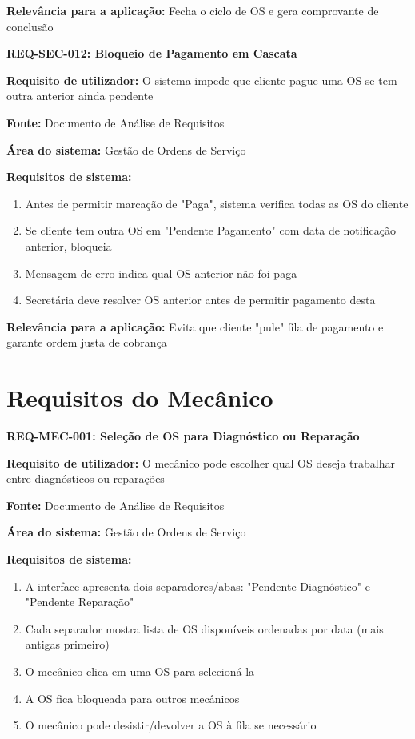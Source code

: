 \documentclass[11pt,a4paper]{article}
\newcommand{\reqheader}[1]{{\noindent\large\bfseries\color{sectionblue}#1}\par\vspace{0.3cm}}
\newcommand{\reqfield}[2]{{\noindent\textbf{#1:} #2}\par\vspace{0.2cm}}
\begin{document}
\reqfield{Relevância para a aplicação}{Fecha o ciclo de OS e gera comprovante de conclusão}

\vspace{0.8cm}

\reqheader{REQ-SEC-012: Bloqueio de Pagamento em Cascata}

\reqfield{Requisito de utilizador}{O sistema impede que cliente pague uma OS se tem outra anterior ainda pendente}

\reqfield{Fonte}{Documento de Análise de Requisitos}

\reqfield{Área do sistema}{Gestão de Ordens de Serviço}

\reqfield{Requisitos de sistema}{
	\begin{enumerate}
		\item Antes de permitir marcação de "Paga", sistema verifica todas as OS do cliente
		\item Se cliente tem outra OS em "Pendente Pagamento" com data de notificação anterior, bloqueia
		\item Mensagem de erro indica qual OS anterior não foi paga
		\item Secretária deve resolver OS anterior antes de permitir pagamento desta
	\end{enumerate}
}

\reqfield{Relevância para a aplicação}{Evita que cliente "pule" fila de pagamento e garante ordem justa de cobrança}

\vspace{1.5cm}


\section*{Requisitos do Mecânico}

\reqheader{REQ-MEC-001: Seleção de OS para Diagnóstico ou Reparação}

\reqfield{Requisito de utilizador}{O mecânico pode escolher qual OS deseja trabalhar entre diagnósticos ou reparações}

\reqfield{Fonte}{Documento de Análise de Requisitos}

\reqfield{Área do sistema}{Gestão de Ordens de Serviço}

\reqfield{Requisitos de sistema}{
	\begin{enumerate}
		\item A interface apresenta dois separadores/abas: "Pendente Diagnóstico" e "Pendente Reparação"
		\item Cada separador mostra lista de OS disponíveis ordenadas por data (mais antigas primeiro)
		\item O mecânico clica em uma OS para selecioná-la
		\item A OS fica bloqueada para outros mecânicos
		\item O mecânico pode desistir/devolver a OS à fila se necessário
	\end{enumerate}
}
\end{document}
